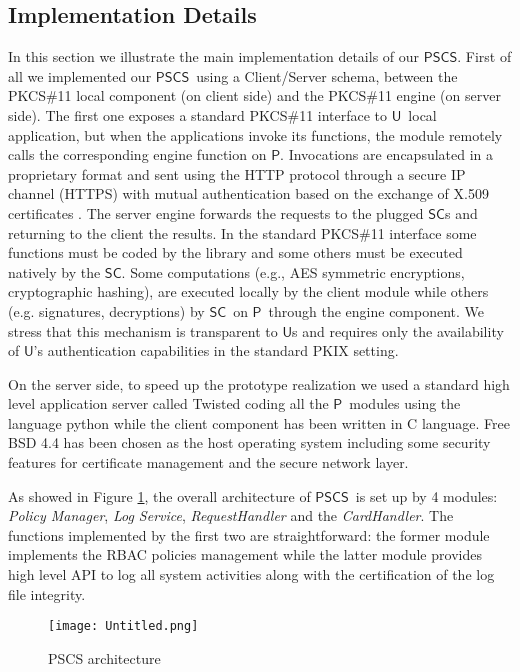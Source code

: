 \documentclass{sig-alternate}
\newcommand{\User}{\ensuremath{\mathsf{U}}}
\newcommand{\Proxy}{\ensuremath{\mathsf{P}}}
\newcommand{\SC}{\ensuremath{\mathsf{SC}}}
\newcommand{\PSCS}{\ensuremath{\mathsf{PSCS}}}
\begin{document}
\subsection{Implementation Details}
In this section we illustrate the main implementation
details of our \PSCS. First of
all we implemented our \PSCS\ using a Client/Server schema, between
the PKCS\#11 local component (on client side) and the PKCS\#11 engine (on server side). The
first one exposes a standard PKCS\#11 interface to \User\ local
application, but when the applications invoke its functions, the
module remotely calls the corresponding engine function on \Proxy . Invocations are encapsulated in a proprietary format
and sent using the HTTP protocol through a secure IP channel (HTTPS)
with mutual authentication based on the exchange of X.509 certificates \cite{PKIX}. The
server engine forwards the requests to the plugged \SC s and returning to
the client the results. In the standard PKCS\#11 interface some
functions must be coded by the library and some others must be
executed natively by the \SC . Some computations (e.g., 
AES symmetric encryptions,  cryptographic hashing), 
are executed locally by the client module while others (e.g.
signatures, decryptions) by \SC\ on \Proxy\ through the engine
component. We stress that this mechanism is transparent to \User s
and requires only the availability of \User's authentication capabilities 
in the standard PKIX \cite{PKIX} setting.

On the server side, to speed up the prototype realization we used a
standard high level application server called Twisted \cite{twisted}
coding all the \Proxy\  modules using the language python while the client component has been written in C
language. Free BSD 4.4 has been chosen as the host operating system
including some security features for certificate management and the
secure network layer.


As showed in Figure \ref{fig:architecture}, the overall architecture of \PSCS\ is
set up by 4  modules: \emph{Policy Manager}, \emph{Log Service},
\emph{RequestHandler} and the \emph{CardHandler}. The functions
implemented by the first two are straightforward: the former module
implements the RBAC policies management while the
latter module provides high level API to log all system activities
along with the certification of the log file integrity.

\begin{figure}[hb]
\centerline{\texttt{[image: Untitled.png]}}
\caption{PSCS architecture} \label{fig:architecture}
\end{figure} 
\end{document}
